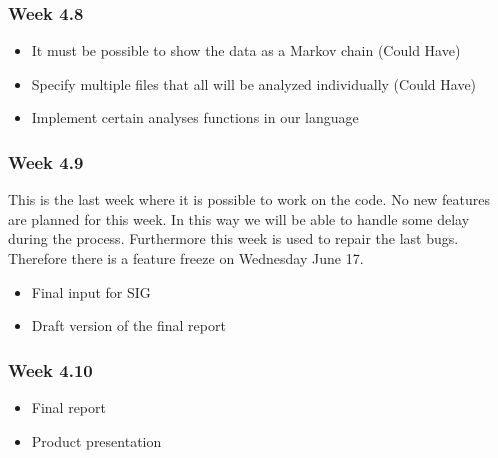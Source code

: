 \subsubsection{Week 4.8}
\begin{itemize}
	\item It must be possible to show the data as a Markov chain (Could Have)
	\item Specify multiple files that all will be analyzed individually (Could Have)
	\item Implement certain analyses functions in our language
\end{itemize}
\subsubsection{Week 4.9}
	This is the last week where it is possible to work on the code. No new features are planned for this week. In this way we will be able to handle some delay during the process. Furthermore this week is used to repair the last bugs. Therefore there is a feature freeze on Wednesday June 17. 
\begin{itemize}
	\item Final input for SIG
	\item Draft version of the final report
\end{itemize}
\subsubsection{Week 4.10}
\begin{itemize}
	\item Final report
	\item Product presentation
\end{itemize}